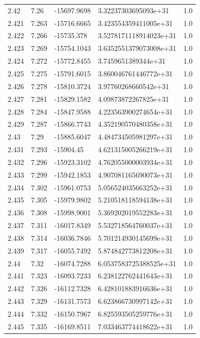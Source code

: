 \begin{tabular}{lllll}
2.42 & 7.26 & -15697.9698 & 3.32237303695093e+31 & 1.0 \\
2.421 & 7.263 & -15716.6665 & 3.423554359411005e+31 & 1.0 \\
2.422 & 7.266 & -15735.378 & 3.5278171118914023e+31 & 1.0 \\
2.423 & 7.269 & -15754.1043 & 3.6352551379073008e+31 & 1.0 \\
2.424 & 7.272 & -15772.8455 & 3.7459651389344e+31 & 1.0 \\
2.425 & 7.275 & -15791.6015 & 3.860046761446772e+31 & 1.0 \\
2.426 & 7.278 & -15810.3724 & 3.97760268660542e+31 & 1.0 \\
2.427 & 7.281 & -15829.1582 & 4.09873872267825e+31 & 1.0 \\
2.428 & 7.284 & -15847.9588 & 4.223563900274654e+31 & 1.0 \\
2.429 & 7.287 & -15866.7743 & 4.352190570480358e+31 & 1.0 \\
2.43 & 7.29 & -15885.6047 & 4.484734505981297e+31 & 1.0 \\
2.431 & 7.293 & -15904.45 & 4.621315005266219e+31 & 1.0 \\
2.432 & 7.296 & -15923.3102 & 4.762055000003934e+31 & 1.0 \\
2.433 & 7.299 & -15942.1853 & 4.907081165690073e+31 & 1.0 \\
2.434 & 7.302 & -15961.0753 & 5.056524035663252e+31 & 1.0 \\
2.435 & 7.305 & -15979.9802 & 5.210518118594138e+31 & 1.0 \\
2.436 & 7.308 & -15998.9001 & 5.369202019552283e+31 & 1.0 \\
2.437 & 7.311 & -16017.8349 & 5.532718564760037e+31 & 1.0 \\
2.438 & 7.314 & -16036.7846 & 5.701214930145699e+31 & 1.0 \\
2.439 & 7.317 & -16055.7492 & 5.874842773812208e+31 & 1.0 \\
2.44 & 7.32 & -16074.7288 & 6.0537583725388525e+31 & 1.0 \\
2.441 & 7.323 & -16093.7233 & 6.238122762441643e+31 & 1.0 \\
2.442 & 7.326 & -16112.7328 & 6.428101883916636e+31 & 1.0 \\
2.443 & 7.329 & -16131.7573 & 6.623866730997142e+31 & 1.0 \\
2.444 & 7.332 & -16150.7967 & 6.825593505259776e+31 & 1.0 \\
2.445 & 7.335 & -16169.8511 & 7.033463774418622e+31 & 1.0 \\

\end{tabular}

